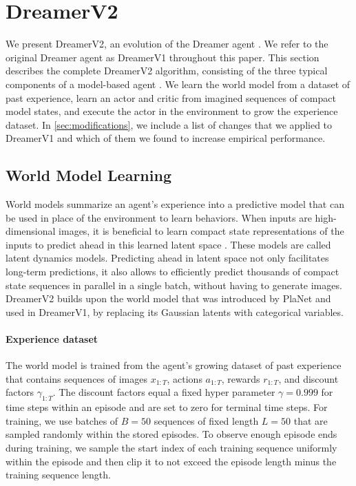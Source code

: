\section{DreamerV2}
\label{sec:method}

We present DreamerV2, an evolution of the Dreamer agent \citep{hafner2019dreamer}. We refer to the original Dreamer agent as DreamerV1 throughout this paper. This section describes the complete DreamerV2 algorithm, consisting of the three typical components of a model-based agent \citep{sutton1991dyna}. We learn the world model from a dataset of past experience, learn an actor and critic from imagined sequences of compact model states, and execute the actor in the environment to grow the experience dataset. In \cref{sec:modifications}, we include a list of changes that we applied to DreamerV1 and which of them we found to increase empirical performance.

\subsection{World Model Learning}

World models summarize an agent's experience into a predictive model that can be used in place of the environment to learn behaviors. When inputs are high-dimensional images, it is beneficial to learn compact state representations of the inputs to predict ahead in this learned latent space \citep{watter2015e2c,karl2016dvbf,ha2018worldmodels}. These models are called latent dynamics models. Predicting ahead in latent space not only facilitates long-term predictions, it also allows to efficiently predict thousands of compact state sequences in parallel in a single batch, without having to generate images. DreamerV2 builds upon the world model that was introduced by PlaNet \citep{hafner2018planet} and used in DreamerV1, by replacing its Gaussian latents with categorical variables.



\paragraph{Experience dataset}

The world model is trained from the agent's growing dataset of past experience that contains sequences of images $x_{1:T}$, actions $a_{1:T}$, rewards $r_{1:T}$, and discount factors $\gamma_{1:T}$. The discount factors equal a fixed hyper parameter $\gamma=0.999$ for time steps within an episode and are set to zero for terminal time steps. For training, we use batches of $B=50$ sequences of fixed length $L=50$ that are sampled randomly within the stored episodes. To observe enough episode ends during training, we sample the start index of each training sequence uniformly within the episode and then clip it to not exceed the episode length minus the training sequence length.

